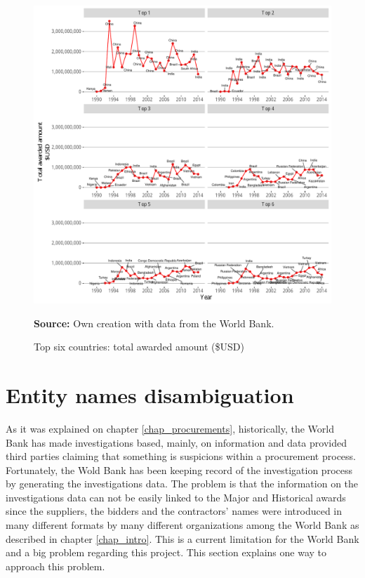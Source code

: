 \begin{figure}[H]
\begin{center}
\caption{Top six countries: total awarded amount (\$USD)}
\label{fig_major_awarded_usd_top}
\includegraphics[max width=1\textwidth]{../img/major_historic_top_usd_awarded.pdf}
\end{center}
\noindent \footnotesize{\textbf{Source:} Own creation with data from the World Bank.}
\end{figure}

\newpage


\section{Entity names disambiguation}

As it was explained on chapter \ref{chap_procurements}, historically, the World Bank has made investigations based, mainly, on information and data provided third parties claiming that something is suspicions within a procurement process. Fortunately, the Wold Bank has been keeping record of the investigation process by generating the investigations data. The problem is that the information on the investigations data can not be easily linked to the Major and Historical awards since the suppliers, the bidders and the contractors' names were introduced in many different formats by many different organizations among the World Bank as described in chapter \ref{chap_intro}. This is a current limitation for the World Bank and a big problem regarding this project. This section explains one way to approach this problem.

